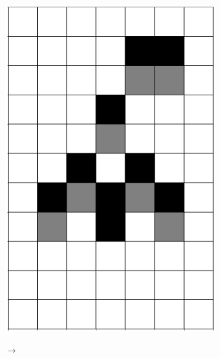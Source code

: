\documentclass[12pt]{article}
\numberwithin{figure}{section} %
\begin{document}
\begin{figure}[H]
\begin{subfigure}{0.3\textwidth}
     		\includegraphics[angle=270,width=\linewidth]{Section4/6.2}
     		\subcaption{}
   	\end{subfigure}
	\begin{subfigure}[t]{0.03\textwidth}
      		{\LARGE$\xrightarrow{}$}
	\end{subfigure}
      	\newline
   	\setcounter{subfigure}{0}


\end{figure}
\end{document}
